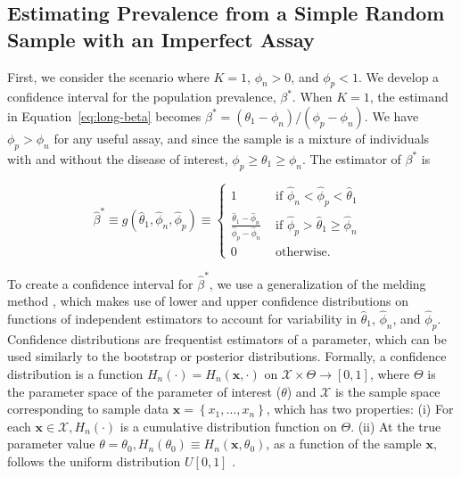 \documentclass[AMA,STIX1COL]{WileyNJD-v2}
\begin{document}
\subsection{Estimating Prevalence from a Simple Random Sample with an Imperfect Assay}
\label{sec:srs-imperfect}

First, we consider the scenario where \( K = 1 \), \( \phi_n > 0 \), and \( \phi_p < 1 \).
We develop a confidence interval for the population prevalence, \( \beta^* \).
When \( K = 1 \), the estimand in Equation~\ref{eq:long-beta} becomes $\beta^* = (\theta_1 - \phi_n)/(\phi_p-\phi_n)$. We have $\phi_p > \phi_n$ for any useful assay, and since the sample is a mixture of individuals with and without the disease of interest, $\phi_p \geq \theta_1 \geq \phi_n$. The estimator of $\beta^*$ is 

\begin{equation}
\hat{\beta}^* \equiv 
g(\hat{\theta}_1, \hat{\phi}_n, \hat{\phi}_p)
\equiv 
\left\{ 
\begin{array}{ll}
1 & \mbox{ if $\hat{\phi}_n < \hat{\phi}_p < \hat{\theta}_1$ }  \\
\frac{\hat{\theta}_1 - \hat{\phi}_n}{\hat{\phi}_p - \hat{\phi}_n} & 
\mbox{ if $\hat{\phi}_p > \hat{\theta}_1 \geq \hat{\phi}_n$ } \\
0 & \mbox{ otherwise.} 
\end{array}
\right.
\label{eq:srs-beta-est}
\end{equation}



To create a confidence interval for \( \hat{\beta}^* \), we use a generalization of the melding method \cite{FayP:2015}, which makes use of lower and upper confidence distributions on functions of independent estimators to account for variability in \( \hat{\theta}_1 \), \( \hat{\phi}_n \), and \( \hat{\phi}_p \). Confidence distributions are frequentist estimators of a parameter, which can be used similarly to the bootstrap or posterior distributions. Formally, a confidence distribution is a function \(H_{n}(\cdot)=H_{n}(\mathbf{x}, \cdot)\) on \(\mathcal{X} \times \Theta \rightarrow[0,1]\), where \( \Theta \) is the parameter space of the parameter of interest (\( \theta \)) and \( \mathcal{X} \) is the sample space corresponding to sample data \(\mathbf{x}=\left\{x_{1}, \ldots, x_{n}\right\}\), which has two properties: (i) For each \(\mathbf{x} \in \mathcal{X}, H_{n}(\cdot)\) is a cumulative distribution function on \(\Theta \). (ii) At the true parameter value \(\theta=\theta_{0}, H_{n}\left(\theta_{0}\right) \equiv H_{n}\left(\mathbf{x}, \theta_{0}\right)\), as a function of the sample \(\mathbf{x}\), follows the uniform distribution \(U[0,1]\) \cite{Xie2013}.
\end{document}
